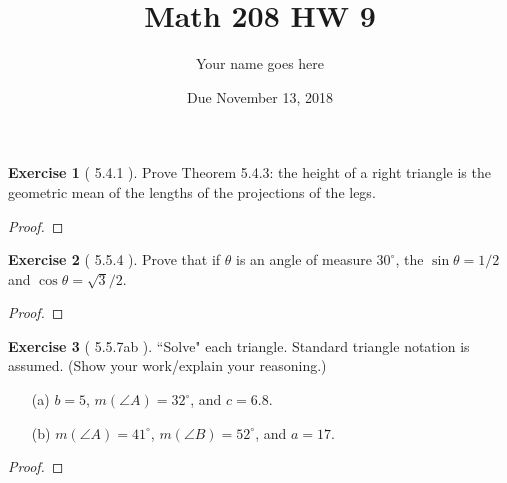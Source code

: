 \documentclass[11pt]{article}		%
\title{Math 208 HW 9}
\author{Your name goes here}  %
\date{Due November 13, 2018}
\theoremstyle{definition}
\newtheorem*{exercise*}{Exercise}
\begin{document}
	\maketitle
	
	





\begin{exercise*}[ 5.4.1   ]
	Prove Theorem 5.4.3: the height of a right triangle is the geometric mean of the lengths of the projections of the legs.
	
\end{exercise*}

\begin{proof} 
	
\end{proof}


\vspace{1in}



\begin{exercise*}[  5.5.4  ]
	Prove that if $\theta$ is an angle of measure $30^\circ$, the $\sin \theta = 1/2$ and $\cos \theta = \sqrt{3}/2$.
	
\end{exercise*}

\begin{proof} 
	
\end{proof}


\vspace{1in}
\begin{exercise*}[ 5.5.7ab   ]
	``Solve" each triangle.  Standard triangle notation is assumed.  (Show your work/explain your reasoning.)
	\begin{enumerate}
		\item[(a)] $b=5$, $m(\angle A) = 32^\circ$, and $c = 6.8$.
		\item[(b)] $m(\angle A) = 41^\circ$, $m(\angle B) = 52^\circ$, and $a = 17$.
	\end{enumerate}
	
\end{exercise*}

\begin{proof} 
	
\end{proof}
\end{document}
